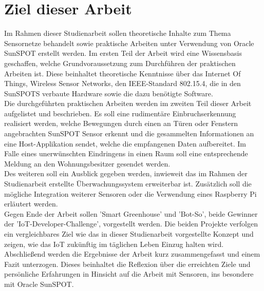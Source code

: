 \section{Ziel dieser Arbeit}\label{s:Ziel} %

Im Rahmen dieser Studienarbeit sollen theoretische Inhalte zum Thema Sensornetze behandelt sowie praktische Arbeiten unter Verwendung von Oracle SunSPOT erstellt werden. Im ersten Teil der Arbeit wird eine Wissensbasis geschaffen, welche Grundvoraussetzung zum Durchführen der praktischen Arbeiten ist. Diese beinhaltet theoretische Kenntnisse über das Internet Of Things, Wireless Sensor Networks, den IEEE-Standard 802.15.4, die in den SunSPOTS verbaute Hardware sowie die dazu benötigte Software.\\

Die durchgeführten praktischen Arbeiten werden im zweiten Teil dieser Arbeit aufgelistet und beschrieben. Es soll eine rudimentäre Einbruchserkennung realisiert werden, welche Bewegungen durch einen an Türen oder Fenstern angebrachten SunSPOT Sensor erkennt und die gesammelten Informationen an eine Host-Applikation sendet, welche die empfangenen Daten aufbereitet. Im Falle eines unerwünschten Eindringens in einen Raum soll eine entsprechende Meldung an den Wohnungsbesitzer gesendet werden.\\
Des weiteren soll ein Ausblick gegeben werden, inwieweit das im Rahmen der Studienarbeit erstellte Überwachungssystem erweiterbar ist. Zusätzlich soll die mögliche Integration weiterer Sensoren oder die Verwendung eines Raspberry Pi erläutert werden.\\

Gegen Ende der Arbeit sollen 'Smart Greenhouse' und 'Bot-So', beide Gewinner der 'IoT-Developer-Challenge', vorgestellt werden. Die beiden Projekte verfolgen ein vergleichbares Ziel wie das in dieser Studienarbeit vorgestellte Konzept und zeigen, wie das IoT zukünftig im täglichen Leben Einzug halten wird. \\

Abschließend werden die Ergebnisse der Arbeit kurz zusammengefasst und einem Fazit unterzogen. Dieses beinhaltet die Reflexion über die erreichten Ziele und persönliche Erfahrungen in Hinsicht auf die Arbeit mit Sensoren, ins besondere mit Oracle SunSPOT.